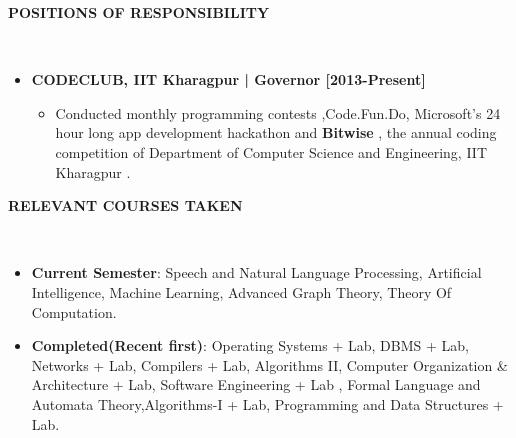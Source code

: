 \documentclass[a4paper,10pt]{article}
\newcommand{\isep}{-2 pt}
\newcommand{\lsep}{-0.5cm}
\newcommand{\resheading}[1]{{\small \colorbox{mygrey}{\begin{minipage}{0.975\textwidth}{\textbf{#1 \vphantom{p\^{E}}}}\end{minipage}}}}
\begin{document}
\resheading{\textbf{POSITIONS OF RESPONSIBILITY} }\\[\lsep]
\begin{itemize}

\item \textbf{CODECLUB, IIT Kharagpur | Governor [2013-Present]}
    \begin{itemize}\itemsep \isep
    \item {Conducted monthly programming contests ,Code.Fun.Do, Microsoft’s 24 hour long app development hackathon and \textbf{Bitwise} , the annual coding competition of Department of Computer Science and Engineering, IIT Kharagpur .}
    \end{itemize}
\end{itemize}

\resheading{\textbf{RELEVANT COURSES TAKEN} }\\[\lsep]
\begin{itemize}
\item \textbf{Current Semester}: Speech and Natural Language Processing, Artificial Intelligence, Machine Learning, Advanced Graph Theory, Theory Of Computation.\\
\item \textbf{Completed(Recent first)}: Operating Systems + Lab, DBMS + Lab, Networks + Lab, Compilers + Lab, Algorithms II, Computer Organization \& Architecture + Lab, Software Engineering + Lab , Formal Language and Automata Theory,Algorithms-I + Lab, Programming and Data Structures + Lab.\\
\end{itemize}
\end{document}
